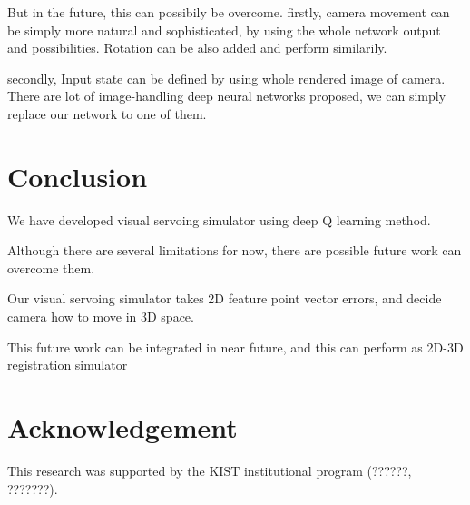 \documentclass[10pt]{article}
\begin{document}
But in the future, this can possibily be overcome.
firstly, camera movement can be simply more natural and sophisticated, by using the whole network output and possibilities.
Rotation can be also added and perform similarily.

secondly, Input state can be defined by using whole rendered image of camera. There are lot of image-handling deep neural networks proposed, we can simply replace our network to one of them.



\section{Conclusion}

We have developed visual servoing simulator using deep Q learning method.

Although there are several limitations for now, there are possible future work can overcome them.

Our visual servoing simulator takes 2D feature point vector errors, and decide camera how to move in 3D space.

This future work can be integrated in near future, and this can perform as 2D-3D registration simulator


\section*{Acknowledgement}
This research was supported by the KIST institutional program (??????, ???????).





%
%
%
%
%
%
%
\end{document}
